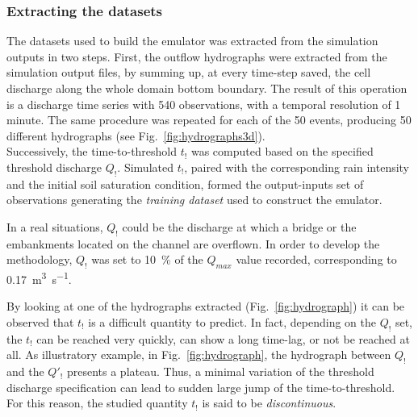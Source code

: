 \subsubsection{Extracting the datasets}
The datasets used to build the emulator was extracted from the simulation outputs in two steps.
First, the outflow hydrographs were extracted from the simulation output files, by summing up, at every time-step saved, the cell discharge along the whole domain bottom boundary. The result of this operation is a discharge time series with \num{540} observations, with a temporal resolution of 1 minute.
The same procedure was repeated for each of the 50 events, producing \num{50} different hydrographs (see Fig.~\ref{fig:hydrographs3d}).\\

Successively, the time-to-threshold $t_!$ was computed based on the specified threshold discharge $Q_!$. 
Simulated $t_!$, paired with the corresponding rain intensity and the initial soil saturation condition, formed the output-inputs set of observations generating the \emph{training dataset} used to construct the emulator. 

In a real situations, $Q_!$ could be the discharge at which a bridge or the embankments located on the channel are overflown. In order to develop the methodology, $Q_!$ was set to \SI{10}{\percent} of the $Q_{max}$ value recorded, corresponding to \SI{0.17}{\cubic\meter\per\second}.
 
By looking at one of the hydrographs extracted (Fig.~\ref{fig:hydrograph}) it can be observed that $t_!$ is a difficult quantity to predict. In fact, depending on the $Q_!$ set, the $t_!$ can be reached very quickly, can show a long time-lag, or not be reached at all. 
As illustratory example, in Fig.~\ref{fig:hydrograph}, the hydrograph between $Q_!$ and the $Q'_!$ presents a plateau. Thus, a minimal variation of the threshold discharge specification can lead to sudden large jump of the time-to-threshold. For this reason, the studied quantity $t_!$ is said to be \emph{discontinuous}.

